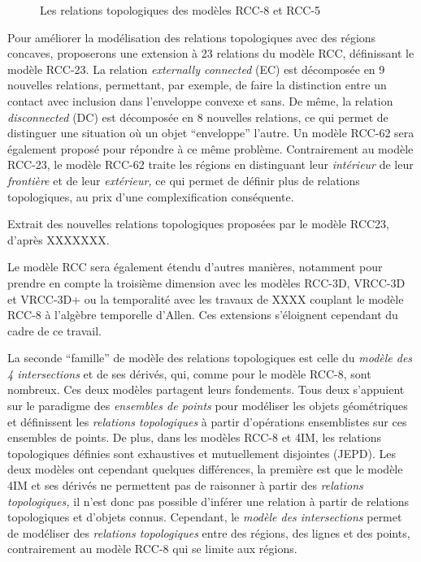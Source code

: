 \begin{figure}
  \centering
  
  \caption{Les relations topologiques des modèles RCC-8 et RCC-5}
  \label{fig:RCC}
\end{figure}

Pour améliorer la modélisation des relations topologiques avec des
régions concaves, \textcite{Cohn1997} proposerons une extension à 23
relations du modèle RCC, définissant le modèle RCC-23. La relation
\emph{externally connected} (EC) est décomposée en 9 nouvelles
relations, permettant, par exemple, de faire la distinction entre un
contact avec inclusion dans l'enveloppe convexe et sans. De même, la
relation \emph{disconnected} (DC) est décomposée en 8 nouvelles
relations, ce qui permet de distinguer une situation où un objet
\enquote{enveloppe} l'autre. Un modèle RCC-62 sera également proposé
pour répondre à ce même problème. Contrairement au modèle RCC-23, le
modèle RCC-62 traite les régions en distinguant leur \emph{intérieur}
de leur \emph{frontière} et de leur \emph{extérieur,} ce qui permet de
définir plus de relations topologiques, au prix d'une complexification
conséquente.

\begin{table}
  \centering
  
  \caption{Extrait des nouvelles relations topologiques proposées par
le modèle RCC23, d'après XXXXXXX.}
  \label{tab:RCC8_vs_RCC23}
\end{table}

Le modèle RCC sera également étendu d'autres manières, notamment pour
prendre en compte la troisième dimension avec les modèles RCC-3D,
VRCC-3D et VRCC-3D+ ou la temporalité avec les travaux de XXXX
couplant le modèle RCC-8 à l'algèbre temporelle d'Allen. Ces
extensions s'éloignent cependant du cadre de ce travail.

La seconde \enquote{famille} de modèle des relations topologiques est
celle du \emph{modèle des 4 intersections}
\autocite[4IM,][]{Egenhofer1989} et de ses dérivés, qui, comme pour le
modèle RCC-8, sont nombreux. Ces deux modèles partagent leurs
fondements. Tous deux s’appuient sur le paradigme des \emph{ensembles
  de points} pour modéliser les objets géométriques et définissent les
\emph{relations topologiques} à partir d'opérations ensemblistes sur
ces ensembles de points. De plus, dans les modèles RCC-8
\autocite{Randell1992} et 4IM, les relations topologiques définies
sont exhaustives et mutuellement disjointes (JEPD). Les deux modèles
ont cependant quelques différences, la première est que le modèle 4IM
et ses dérivés ne permettent pas de raisonner à partir des
\emph{relations topologiques,} il n'est donc pas possible d'inférer
une relation à partir de relations topologiques et d'objets
connus. Cependant, le \emph{modèle des intersections} permet de
modéliser des \emph{relations topologiques} entre des régions, des
lignes et des points, contrairement au modèle RCC-8 qui se limite aux
régions.

